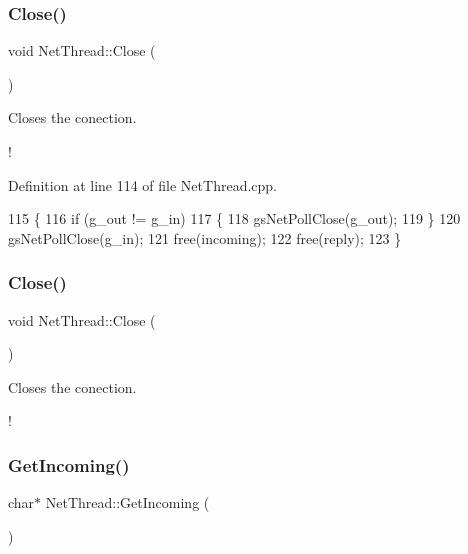 \subsubsection{\texorpdfstring{Close()}{Close()}\hspace{0.1cm}{\footnotesize\ttfamily [1/2]}}
{\footnotesize\ttfamily void Net\+Thread\+::\+Close (\begin{DoxyParamCaption}{ }\end{DoxyParamCaption})}



Closes the conection. 

! 

Definition at line 114 of file Net\+Thread.\+cpp.


\begin{DoxyCode}
115 \{
116     \textcolor{keywordflow}{if} (g\_out != g\_in)
117     \{
118         gsNetPollClose(g\_out);
119     \}
120     gsNetPollClose(g\_in);
121     free(incoming);
122     free(reply);
123 \}
\end{DoxyCode}
\mbox{\label{class_net_thread_ad21658535369817214ae60a6b5fe01e9}} 
\subsubsection{\texorpdfstring{Close()}{Close()}\hspace{0.1cm}{\footnotesize\ttfamily [2/2]}}
{\footnotesize\ttfamily void Net\+Thread\+::\+Close (\begin{DoxyParamCaption}{ }\end{DoxyParamCaption})}



Closes the conection. 

! \mbox{\label{class_net_thread_ac63f5ac2706f99c40b8f5ff340aa263a}} 
\subsubsection{\texorpdfstring{Get\+Incoming()}{GetIncoming()}\hspace{0.1cm}{\footnotesize\ttfamily [1/2]}}
{\footnotesize\ttfamily char$\ast$ Net\+Thread\+::\+Get\+Incoming (\begin{DoxyParamCaption}{ }\end{DoxyParamCaption})}



